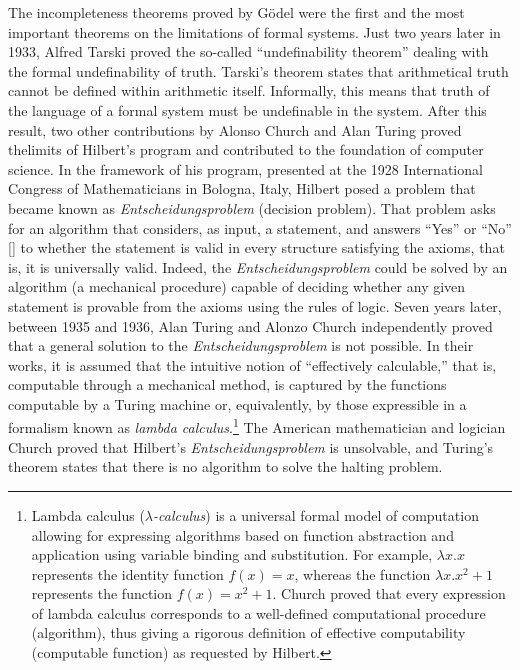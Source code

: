 The incompleteness theorems proved by G\"{o}del were the first and the most important theorems on the limitations of formal systems. Just two years later in 1933, Alfred Tarski proved the so-called ``undefinability theorem'' dealing with the formal undefinability of truth. Tarski's theorem states that arithmetical truth cannot be defined within arithmetic itself. Informally, this means that truth of the language of a formal system must be undefinable in the system. After this result, two other contributions by Alonso Church and Alan Turing proved the\break limits of Hilbert's program and contributed to the foundation of computer science. In the framework of his program, presented at the 1928 International Congress of Mathematicians in Bologna, Italy, Hilbert posed a problem that became known as \textit{Entscheidungsproblem} (decision problem). That problem asks for an algorithm that considers, as input, a statement, and answers ``Yes'' or ``No'' [\citealt{chap:02:Turing:1937}] to whether the statement is valid in every structure satisfying the axioms, that is, it is universally valid. Indeed, the \textit{Entscheidungsproblem} could be solved by an algorithm (a mechanical procedure) capable of deciding whether any given statement is provable from the axioms using the rules of logic. Seven years later, between 1935 and 1936, Alan Turing and Alonzo Church independently proved that a general solution to the \textit{Entscheidungsproblem} is not possible. In their works, it is assumed that the intuitive notion of ``effectively calculable,'' that is, computable through a mechanical method, is captured by the functions computable by a Turing machine or, equivalently, by those expressible in a formalism known as \textit{lambda calculus}.\footnote{Lambda calculus ($\lambda$\textit{-calculus}) is a universal formal model of computation allowing for expressing algorithms based on function abstraction and application using variable binding and \hbox{substitution.} For example, $\lambda x.x$ represents the identity function $f(x)=x$, whereas the function $\lambda x.x{}^{2}+1$ represents the function $f(x)=x^{2}+1$. Church proved that every expression of lambda calculus corresponds to a well-defined computational procedure (algorithm), thus giving a rigorous definition of effective computability (computable function) as requested by Hilbert.} The American mathematician and logician Church proved that Hilbert's \textit{Entscheidungsproblem} is unsolvable, and Turing's theorem states that there is no algorithm to solve the halting problem.

